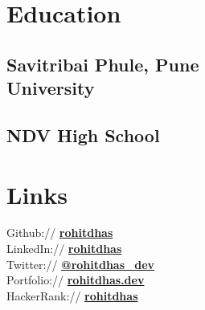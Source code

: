 \documentclass[]{deedy-resume-openfont}
\begin{document}
%
%

%
%

%
%

\begin{minipage}[t]{0.33\textwidth} 


\section{Education} 

\subsection{Savitribai Phule, Pune \\ University}
\sectionsep

\subsection{NDV High School}
\sectionsep


\section{Links}
Github:// \href{https://github.com/rohitdhas}{\bf rohitdhas} \\
LinkedIn://  \href{https://www.linkedin.com/in/rohitdhas}{\bf rohitdhas} \\
Twitter://  \href{https://twitter.com/rohitdhas_dev}{\bf @rohitdhas\_dev} \\
Portfolio://  \href{https://rohitdhas.dev}{\bf rohitdhas.dev} \\
HackerRank:// \href{https://www.hackerrank.com/rohitdhas?hr_r=1}{\bf rohitdhas} \\
\sectionsep


\end{minipage}
\end{document}
